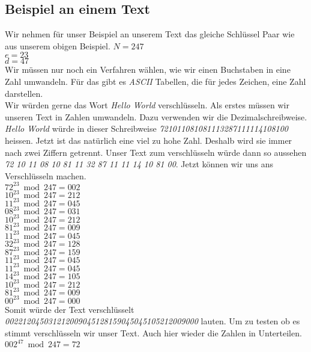 \subsection{Beispiel an einem Text}
Wir nehmen für unser Beispiel an unserem Text das gleiche Schlüssel Paar wie aus unserem obigen Beispiel.
$ N = 247 $\\
$ e = 23 $\\
$ d = 47 $\\
Wir müssen nur noch ein Verfahren wählen, wie wir einen Buchstaben in eine Zahl umwandeln. Für das gibt es \textit{ASCII} Tabellen, die für jedes Zeichen, eine Zahl darstellen.\\
Wir würden gerne das Wort \textit{Hello World} verschlüsseln. Als erstes müssen wir unseren Text in Zahlen umwandeln. Dazu verwenden wir die Dezimalschreibweise.\\
\textit{Hello World} würde in dieser Schreibweise \textit{721011081081113287111114108100} heissen. Jetzt ist das natürlich eine viel zu hohe Zahl. Deshalb wird sie immer nach zwei Ziffern getrennt. Unser Text zum verschlüsseln würde dann so aussehen \textit{72 10 11 08 10 81 11 32 87 11 11 14 10 81 00}. Jetzt können wir uns ans Verschlüsseln machen. \\
$ 72^{23} \bmod 247 = 002 $ \\
$ 10^{23} \bmod 247 = 212 $ \\
$ 11^{23} \bmod 247 = 045 $ \\
$ 08^{23} \bmod 247 = 031 $ \\
$ 10^{23} \bmod 247 = 212 $ \\
$ 81^{23} \bmod 247 = 009 $ \\
$ 11^{23} \bmod 247 = 045 $ \\
$ 32^{23} \bmod 247 = 128 $ \\
$ 87^{23} \bmod 247 = 159 $ \\
$ 11^{23} \bmod 247 = 045 $ \\
$ 11^{23} \bmod 247 = 045 $ \\
$ 14^{23} \bmod 247 = 105 $ \\
$ 10^{23} \bmod 247 = 212 $ \\
$ 81^{23} \bmod 247 = 009 $ \\
$ 00^{23} \bmod 247 = 000 $ \\
Somit würde der Text verschlüsselt \textit{002212045031212009045128159045045105212009000} lauten.
Um zu testen ob es stimmt verschlüsseln wir unser Text. Auch hier wieder die Zahlen in Unterteilen.
$ 002^{47} \bmod 247 = 72 $ \\
